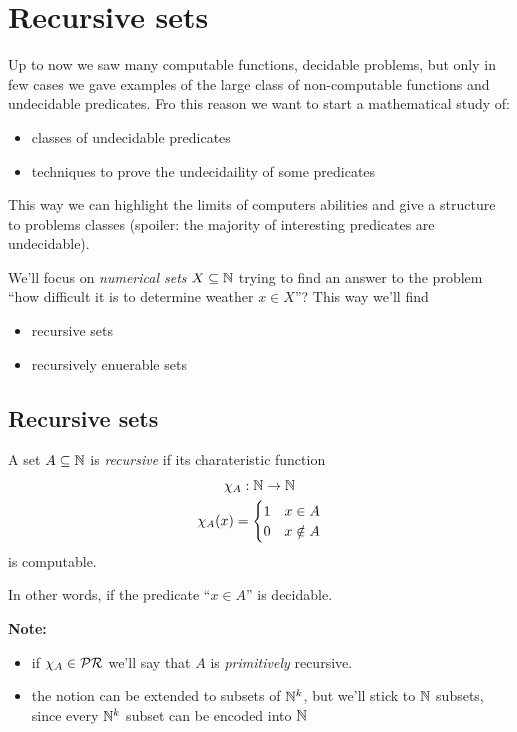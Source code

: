 \chapter{Recursive sets}
Up to now we saw many computable functions, decidable problems, but
only in few cases we gave examples of the large class of
non-computable functions and undecidable predicates. Fro this reason
we want to start a mathematical study of:
\begin{itemize}
\item classes of undecidable predicates
\item techniques to prove the undecidaility of some predicates
\end{itemize}
This way we can highlight the limits of computers abilities and give a
structure to problems classes (spoiler: the majority of interesting
predicates are undecidable).

We'll focus on \emph{numerical sets} $X \subseteq \mathbb{N}$ trying to find
an answer to the problem ``how difficult it is to determine weather
$x \in X$''? This way we'll find
\begin{itemize}
\item recursive sets
\item recursively enuerable sets
\end{itemize}

\section{Recursive sets}
\begin{definition}
  A set $A \subseteq \mathbb{N}$ is \emph{recursive} if its charateristic
  function
  \begin{gather*}
    \chi_A : \mathbb{N} \rightarrow \mathbb{N} \\
    \chi_A(x) = \begin{cases}
      1 & x\in A \\
      0 & x \notin A
    \end{cases}
  \end{gather*}
  is computable.
\end{definition}

In other words, if the predicate ``$x \in A$'' is decidable.

\textbf{Note:}
\begin{itemize}
\item if $\chi_A \in \mathcal{PR}$ we'll say that $A$ is \emph{primitively}
  recursive.
\item the notion can be extended to subsets of $\mathbb{N}^k$, but we'll
  stick to $\mathbb{N}$ subsets, since every $\mathbb{N}^k$ subset can be encoded
  into $\mathbb{N}$
\end{itemize}

